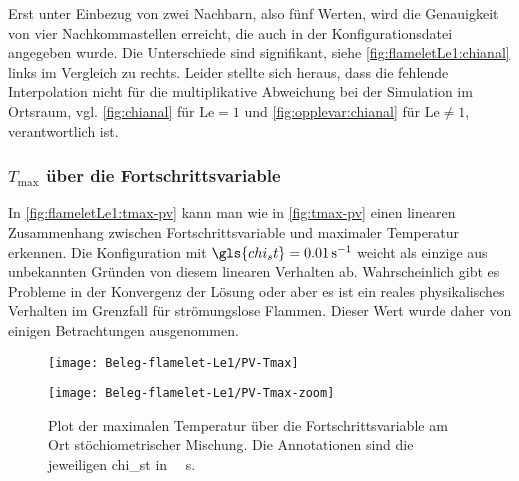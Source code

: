 Erst unter Einbezug von zwei Nachbarn, also fünf Werten, wird die Genauigkeit von vier Nachkommastellen erreicht, die auch in der Konfigurationsdatei angegeben wurde. Die Unterschiede sind signifikant, siehe \autoref{fig:flameletLe1:chianal} links im Vergleich zu rechts. Leider stellte sich heraus, dass die fehlende Interpolation nicht für die multiplikative Abweichung bei der Simulation im Ortsraum, vgl. \autoref{fig:chianal} für $\mathrm{Le}=1$ und \ref{fig:opplevar:chianal} für $\mathrm{Le}\neq1$, verantwortlich ist.


\subsubsection{\texorpdfstring{$T_\mathrm{max}$}{Tmax} über die Fortschrittsvariable}

In \autoref{fig:flameletLe1:tmax-pv} kann man wie in \autoref{fig:tmax-pv} einen linearen Zusammenhang zwischen Fortschrittsvariable und maximaler Temperatur erkennen. Die Konfiguration mit $\gls{chi_st}=\SI{0.01}{\per\second}$ weicht als einzige aus unbekannten Gründen von diesem linearen Verhalten ab. Wahrscheinlich gibt es Probleme in der Konvergenz der Lösung oder aber es ist ein reales physikalisches Verhalten im Grenzfall für strömungslose Flammen. Dieser Wert wurde daher von einigen Betrachtungen ausgenommen.

\begin{figure}[H]
    \begin{minipage}{0.5\linewidth}\begin{center}
        \texttt{[image: Beleg-flamelet-Le1/PV-Tmax]}
    \end{center}\end{minipage}\begin{minipage}{0.5\linewidth}\begin{center}
        \texttt{[image: Beleg-flamelet-Le1/PV-Tmax-zoom]}
    \end{center}\end{minipage}
    \caption{
        Plot der maximalen Temperatur über die Fortschrittsvariable am Ort stöchiometrischer Mischung. Die Annotationen sind die jeweiligen \gls{chi_st} in \SI{}{\per\second}.
    }
    \label{fig:flameletLe1:tmax-pv}
\end{figure}

